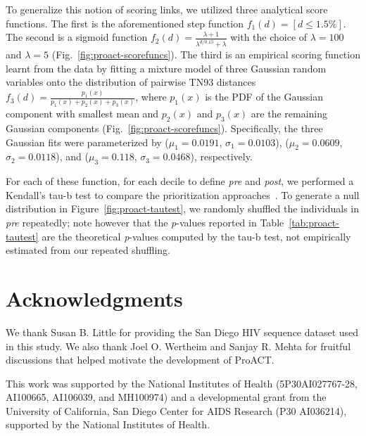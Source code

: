 To generalize this notion of scoring links, we utilized three analytical score functions. The first is the aforementioned step function $f_1(d)=\left[d\le1.5\%\right]$. The second is a sigmoid function $f_2(d)=\frac{\lambda+1}{\lambda^{d/0.15}+\lambda}$ with the choice of $\lambda=100$ and $\lambda=5$ (Fig.~\ref{fig:proact-scorefuncs}). The third is an empirical scoring function learnt from the data by fitting a mixture model of three Gaussian random variables onto the distribution of pairwise \gls{TN93} distances $f_3(d)=\frac{p_1(x)}{p_1(x)+p_2(x)+p_3(x)}$, where $p_1(x)$ is the \gls{PDF} of the Gaussian component with smallest mean and $p_2(x)$ and $p_3(x)$ are the remaining Gaussian components (Fig.~\ref{fig:proact-scorefuncs}). Specifically, the three Gaussian fits were parameterized by ($\mu_1=0.0191$, $\sigma_1=0.0103$), ($\mu_2=0.0609$, $\sigma_2=0.0118$), and ($\mu_3=0.118$, $\sigma_3=0.0468$), respectively.

For each of these function, for each decile to define \textit{pre} and \textit{post}, we performed a Kendall's tau-b test to compare the prioritization approaches~\cite{Kendall1938}. To generate a null distribution in Figure~\ref{fig:proact-tautest}, we randomly shuffled the individuals in \textit{pre} repeatedly; note however that the \textit{p}-values reported in Table~\ref{tab:proact-tautest} are the theoretical \textit{p}-values computed by the tau-b test, not empirically estimated from our repeated shuffling.

\section{Acknowledgments}
We thank Susan B. Little for providing the San Diego \gls{HIV} sequence dataset used in this study. We also thank Joel O. Wertheim and Sanjay R. Mehta for fruitful discussions that helped motivate the development of ProACT.

This work was supported by the National Institutes of Health (5P30AI027767-28, AI100665, AI106039, and MH100974) and a developmental grant from the University of California, San Diego Center for AIDS Research (P30 AI036214), supported by the National Institutes of Health.

\ackproact

